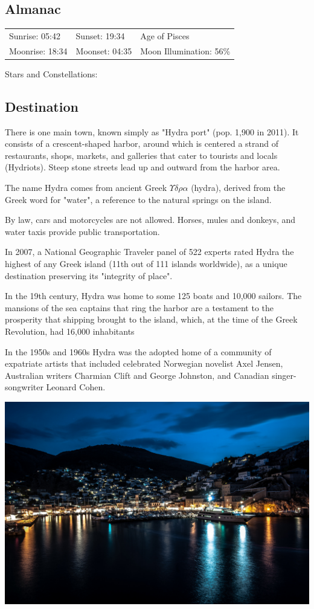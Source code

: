\documentclass[12pt,a4paper,oneside]{article}
\begin{document}
\begin{multicols}{2}
\subsection*{Almanac}
\begin{tabular}{p{2cm} p{2cm} p{3cm}}
Sunrise: 05:42 & Sunset: 19:34 &	Age of Pisces\\
Moonrise: 18:34 & Moonset: 04:35 & Moon Illumination: 56\% \\
\end{tabular}

\noindent Stars and Constellations:

\subsection*{Destination}

There is one main town, known simply as "Hydra port" (pop. 1,900 in 2011). It consists of a crescent-shaped harbor, around which is centered a strand of restaurants, shops, markets, and galleries that cater to tourists and locals (Hydriots). Steep stone streets lead up and outward from the harbor area.

The name Hydra comes from ancient Greek $\Upsilon\delta\rho\alpha$ (hydra), derived from the Greek word for "water", a reference to the natural springs on the island.

By law, cars and motorcycles are not allowed. Horses, mules and donkeys, and water taxis provide public transportation.

In 2007, a National Geographic Traveler panel of 522 experts rated Hydra the highest of any Greek island (11th out of 111 islands worldwide), as a unique destination preserving its "integrity of place".

In the 19th century, Hydra was home to some 125 boats and 10,000 sailors. The mansions of the sea captains that ring the harbor are a testament to the prosperity that shipping brought to the island, which, at the time of the Greek Revolution, had 16,000 inhabitants

In the 1950s and 1960s Hydra was the adopted home of a community of expatriate artists that included celebrated Norwegian novelist Axel Jensen, Australian writers Charmian Clift and George Johnston, and Canadian singer-songwriter Leonard Cohen.

\includegraphics[scale=0.24]{hydra-visualhunt.jpg} 


\end{multicols}
\end{document}
